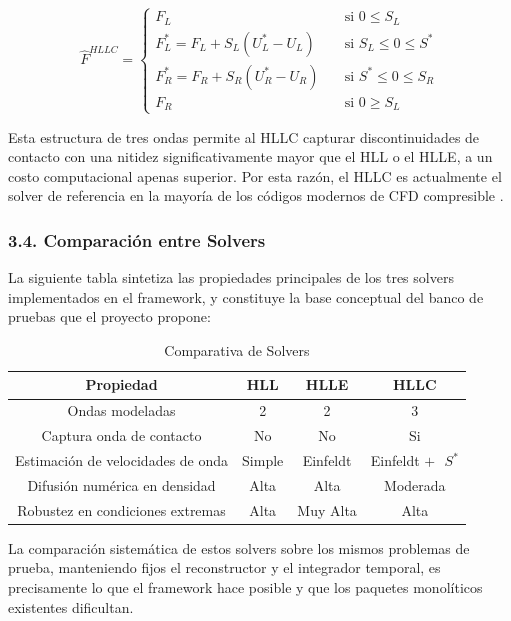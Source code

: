 \documentclass[11pt,openany]{book}
\begin{document}
\begin{equation}
    \hat{F}^{HLLC} = 
    \begin{cases}
        F_{L} &\quad\text{si } 0 \leq S_{L}\\
        F_{L}^{*} = F_{L} + S_{L}(U_{L}^{*} - U_{L}) &\quad\text{si } S_{L} \leq 0 \leq S^{*}\\
        F_{R}^{*} = F_{R} + S_{R}(U_{R}^{*} - U_{R}) &\quad\text{si } S^{*} \leq 0 \leq S_{R}\\
        F_{R} &\quad\text{si } 0 \ge S_{L}
    \end{cases}
\end{equation}

Esta estructura de tres ondas permite al HLLC capturar discontinuidades de contacto con una nitidez significativamente mayor que el HLL o el HLLE, a un costo computacional apenas superior. Por esta razón, el HLLC es actualmente el solver de referencia en la mayoría de los códigos modernos de CFD compresible \parencite{toro2013riemann}.

\subsubsection{3.4. Comparación entre Solvers}\textbf{}

La siguiente tabla sintetiza las propiedades principales de los tres solvers implementados en el framework, y constituye la base conceptual del banco de pruebas que el proyecto propone:

\begin{table}[htbp]
    \centering
    \begin{tabular}{|c|c|c|c|}
    \hline\textbf{Propiedad} & \textbf{HLL} & \textbf{HLLE} & \textbf{HLLC} \\
    \hline Ondas modeladas & 2 & 2 & 3 \\
    \hline Captura onda de contacto & No & No & Si \\
    \hline Estimación de velocidades de onda & Simple & Einfeldt & Einfeldt $+ \text{ }  S^{*}$ \\
    \hline Difusión numérica en densidad & Alta & Alta & Moderada \\
    \hline Robustez en condiciones extremas & Alta & Muy Alta & Alta \\
    \hline
    \end{tabular}
    \caption{Comparativa de Solvers}
    \label{tab:name}
\end{table}

La comparación sistemática de estos solvers sobre los mismos problemas de prueba, manteniendo fijos el reconstructor y el integrador temporal, es precisamente lo que el framework hace posible y que los paquetes monolíticos existentes dificultan.
\end{document}
